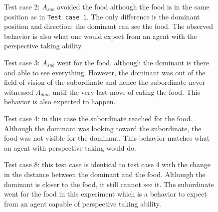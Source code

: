 \documentclass{article}
\begin{document}
\begin{figure}[H]
\begin{center}
    \caption{Test  case 2: \(A_{sub}\) avoided the food although the food is in the same position as in \texttt{Test case 1}. The only difference is the dominant position and direction: the dominant can see the food. The observed behavior is also what one would expect from an agent with the perspective taking ability.}
    \label{fig.tc.2}
\end{center}
\end{figure}
\begin{figure}[H]
\begin{center}
\caption{Test  case 3: \(A_{sub}\) went for the food, although the dominant is there and able to see everything. However, the dominant was out of the field of vision of the subordinate and hence the subordinate never witnessed \(A_{dom}\) until the very last move of eating the food. This behavior is also expected to happen.}
\label{fig.tc.3}
\end{center}
\end{figure}
\begin{figure}[H]
\begin{center}
\caption{Test  case 4: in this case the subordinate reached for the food. Although the dominant was looking toward the subordinate, the food was not visible for the dominant. This behavior matches what an agent with perspective taking would do.}
\label{fig.tc.4}
\end{center}
\end{figure}
\begin{figure}[H]
\begin{center}
\caption{Test  case 8: this test case is identical to test case 4 with the change in the distance between the dominant and the food. Although the dominant is closer to the food, it still cannot see it. The subordinate went for the food in this experiment which is a behavior to expect from an agent capable of perspective taking ability.}
\label{fig.tc.4}
\end{center}
\end{figure}
\end{document}
